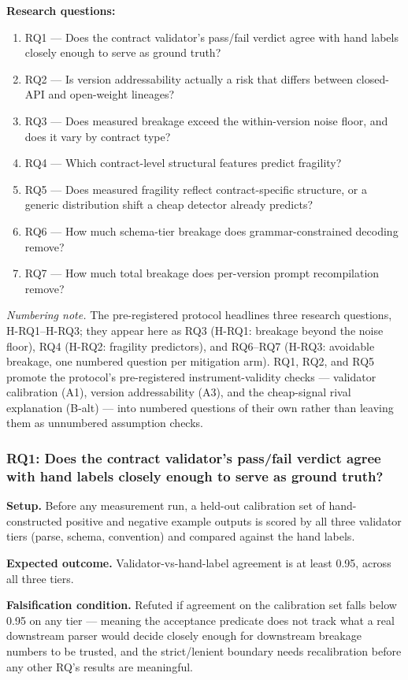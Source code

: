 \documentclass[11pt]{article}
\begin{document}
\textbf{Research questions:}
\begin{enumerate}[leftmargin=1.6em]
\item RQ1 --- Does the contract validator's pass/fail verdict agree with hand labels closely enough to serve as ground truth?
\item RQ2 --- Is version addressability actually a risk that differs between closed-API and open-weight lineages?
\item RQ3 --- Does measured breakage exceed the within-version noise floor, and does it vary by contract type?
\item RQ4 --- Which contract-level structural features predict fragility?
\item RQ5 --- Does measured fragility reflect contract-specific structure, or a generic distribution shift a cheap detector already predicts?
\item RQ6 --- How much schema-tier breakage does grammar-constrained decoding remove?
\item RQ7 --- How much total breakage does per-version prompt recompilation remove?
\end{enumerate}

\noindent\emph{Numbering note.} The pre-registered protocol headlines three research questions, H-RQ1--H-RQ3; they appear here as RQ3 (H-RQ1: breakage beyond the noise floor), RQ4 (H-RQ2: fragility predictors), and RQ6--RQ7 (H-RQ3: avoidable breakage, one numbered question per mitigation arm). RQ1, RQ2, and RQ5 promote the protocol's pre-registered instrument-validity checks --- validator calibration (A1), version addressability (A3), and the cheap-signal rival explanation (B-alt) --- into numbered questions of their own rather than leaving them as unnumbered assumption checks.

\subsubsection{RQ1: Does the contract validator's pass/fail verdict agree with hand labels closely enough to serve as ground truth?}
\textbf{Setup.} Before any measurement run, a held-out calibration set of hand-constructed positive and negative example outputs is scored by all three validator tiers (parse, schema, convention) and compared against the hand labels.

\textbf{Expected outcome.} Validator-vs-hand-label agreement is at least 0.95, across all three tiers.

\textbf{Falsification condition.} Refuted if agreement on the calibration set falls below 0.95 on any tier --- meaning the acceptance predicate does not track what a real downstream parser would decide closely enough for downstream breakage numbers to be trusted, and the strict/lenient boundary needs recalibration before any other RQ's results are meaningful.
\end{document}
